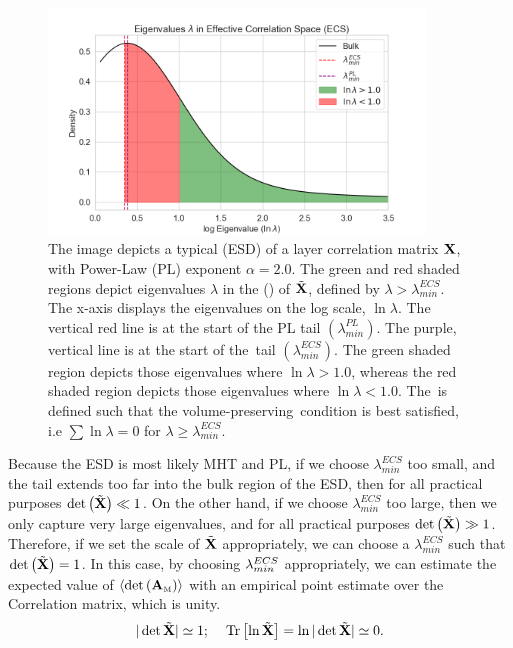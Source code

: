 \begin{figure}[t]
  \begin{center}
  \includegraphics[width=10cm]{./img/ECS_space.png}
  \caption{The image depicts a typical
    \EmpiricalSpectralDensity (ESD) of a layer correlation matrix $\mathbf{X}$, with \WW Power-Law (PL) exponent
    $\alpha=2.0$.%
    The green and red shaded regions depict
    eigenvalues $\lambda$ in the \EffectiveCorrelationSpace (\ECS) of $\tilde{\mathbf{X}}$, defined by $\lambda>\lambda_{min}^{ECS}$.
    The x-axis displays the eigenvalues on the log scale, $\ln\lambda$.
    The vertical red line is at the start of the PL tail  $(\lambda_{min}^{PL})$.
    The purple, vertical line is at the start of the~\ECS tail  $(\lambda_{min}^{ECS})$.
    The green shaded region depicts those eigenvalues where $\ln\lambda>1.0$,
    whereas the red shaded region depicts those eigenvalues where $\ln\lambda<1.0$.
    The~\ECS is defined such that the volume-preserving~\TRACELOG condition is best satisfied, i.e $\sum\ln\lambda= 0$ for $\lambda\ge\lambda_{min}^{ECS}$.
    }
  \end{center}
  \label{fig:ECS_space}
\end{figure}

Because the \Teacher ESD is most likely MHT and PL, 
if we choose $\lambda_{min}^{ECS}$ too small, and the tail extends too far into the bulk region of the ESD,
then for all practical purposes $\mbox{}{\text{det}}\left(\tilde{\mathbf{X}}\right)\ll 1$.
On the other hand, if we choose $\lambda_{min}^{ECS}$ too large,
then we only capture very large eigenvalues, and for all practical purposes $\mbox{}{\text{det}}\left(\tilde{\mathbf{X}}\right) \gg 1$.
Therefore, if we set the scale of $\tilde{\mathbf{X}}$ appropriately, we can choose a $\lambda_{min}^{ECS}$ such that $\mbox{}{\text{det}}\left(\tilde{\mathbf{X}}\right)=1$.
In this case, by choosing $\lambda^{ECS}_{min}$ appropriately, we can estimate the expected value of
$\langle\mbox{}{\text{det}}\left({\mathbf{A}}_{\text{\tiny M}}\right)\rangle$  with an empirical point estimate over the \Teacher Correlation matrix, which is unity.
\begin{equation}
\label{eqn:detX}
\vert\det\tilde{\mathbf{X}}\vert \simeq 1 ; \quad \mbox{}\operatorname{Tr}\left[ \ln\tilde{\mathbf{X}} \right] = \ln\vert\det\tilde{\mathbf{X}}\vert \simeq 0  .
\end{equation} 

